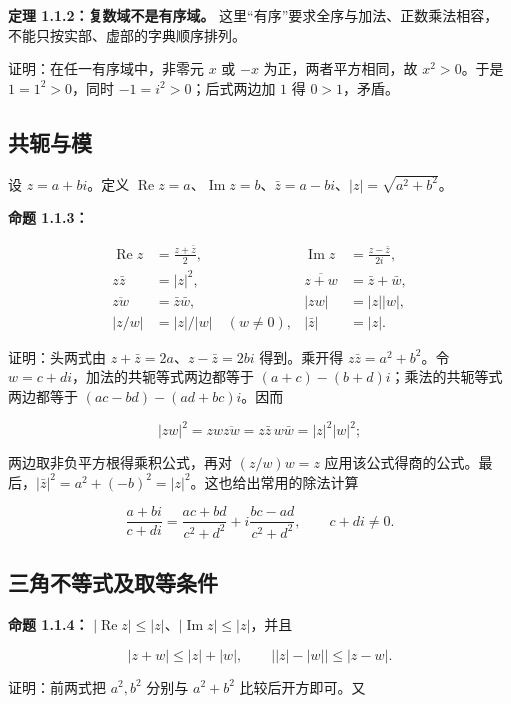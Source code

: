 \documentclass[11pt,a4paper]{article}
\begin{document}
\textbf{定理 1.1.2：复数域不是有序域。}
这里``有序''要求全序与加法、正数乘法相容，不能只按实部、虚部的字典顺序排列。

证明：在任一有序域中，非零元 \(x\) 或 \(-x\) 为正，两者平方相同，故
\(x^2>0\)。于是 \(1=1^2>0\)，同时 \(-1=i^2>0\)；后式两边加 \(1\) 得
\(0>1\)，矛盾。

\subsection{共轭与模}\label{ux5171ux8f6dux4e0eux6a21}

设 \(z=a+bi\)。定义
\(\operatorname{Re}z=a\)、\(\operatorname{Im}z=b\)、\(\bar z=a-bi\)、\(|z|=\sqrt{a^2+b^2}\)。

\textbf{命题 1.1.3：}

\[
\begin{aligned}
\operatorname{Re}z&=\frac{z+\bar z}{2},&
\operatorname{Im}z&=\frac{z-\bar z}{2i},\\
z\bar z&=|z|^2,&\overline{z+w}&=\bar z+\bar w,\\
\overline{zw}&=\bar z\bar w,&|zw|&=|z||w|,\\
|z/w|&=|z|/|w|\quad(w\ne0),&|\bar z|&=|z|.
\end{aligned}
\]

证明：头两式由 \(z+\bar z=2a\)、\(z-\bar z=2bi\) 得到。乘开得
\(z\bar z=a^2+b^2\)。令 \(w=c+di\)，加法的共轭等式两边都等于
\((a+c)-(b+d)i\)；乘法的共轭等式两边都等于 \((ac-bd)-(ad+bc)i\)。因而

\[
|zw|^2=zw\overline{zw}=z\bar z\,w\bar w=|z|^2|w|^2;
\]

两边取非负平方根得乘积公式，再对 \((z/w)w=z\)
应用该公式得商的公式。最后，\(|\bar z|^2=a^2+(-b)^2=|z|^2\)。这也给出常用的除法计算

\[
\frac{a+bi}{c+di}=\frac{ac+bd}{c^2+d^2}
+i\frac{bc-ad}{c^2+d^2},\qquad c+di\ne0.
\]

\subsection{三角不等式及取等条件}\label{ux4e09ux89d2ux4e0dux7b49ux5f0fux53caux53d6ux7b49ux6761ux4ef6}

\textbf{命题 1.1.4：}
\(|\operatorname{Re}z|\le|z|\)、\(|\operatorname{Im}z|\le|z|\)，并且

\[
|z+w|\le|z|+|w|,\qquad
\bigl||z|-|w|\bigr|\le|z-w|.
\]

证明：前两式把 \(a^2,b^2\) 分别与 \(a^2+b^2\) 比较后开方即可。又
\end{document}
